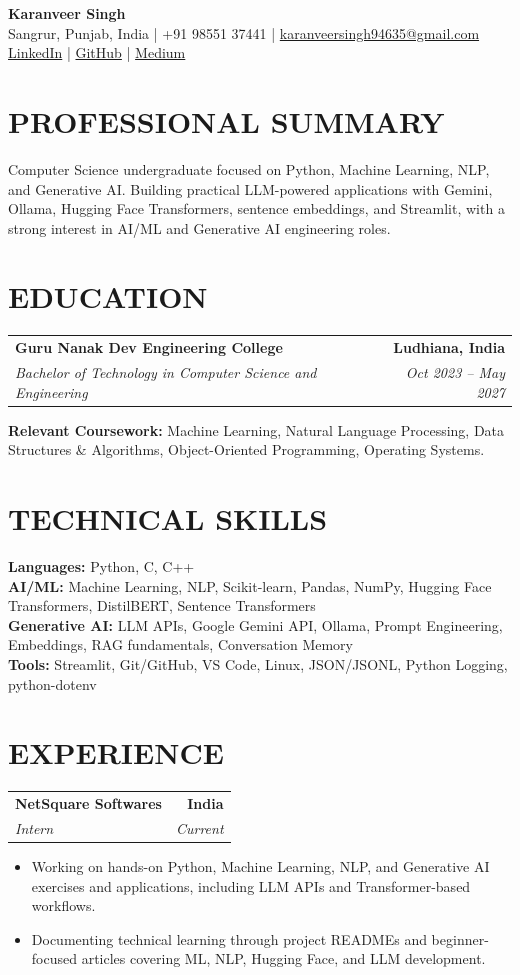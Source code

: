 \documentclass[10pt,a4paper]{article}
\makeatletter
\newcommand{\resumeEntry}[4]{%
  \begin{tabularx}{\linewidth}{@{}Xr@{}}
    \textbf{#1} & \textbf{#2} \\
    \textit{#3} & \textit{#4}
  \end{tabularx}\vspace{-2pt}
}
\makeatother
\begin{document}
\begin{center}
    {\fontsize{22}{24}\selectfont\bfseries Karanveer Singh}\\[3pt]
    Sangrur, Punjab, India \;|\; +91 98551 37441 \;|\;
    \href{mailto:karanveersingh94635@gmail.com}{karanveersingh94635@gmail.com}\\[2pt]
    \href{https://www.linkedin.com/in/karanveer-singh-926a0b287}{LinkedIn} \;|\;
    \href{https://github.com/Karanveer05}{GitHub} \;|\;
    \href{https://medium.com/@karanveernetsquaresoftwares}{Medium}
\end{center}
\vspace{-4pt}

\section{PROFESSIONAL SUMMARY}
Computer Science undergraduate focused on Python, Machine Learning, NLP, and Generative AI. Building practical LLM-powered applications with Gemini, Ollama, Hugging Face Transformers, sentence embeddings, and Streamlit, with a strong interest in AI/ML and Generative AI engineering roles.

\section{EDUCATION}
\resumeEntry{Guru Nanak Dev Engineering College}{Ludhiana, India}{Bachelor of Technology in Computer Science and Engineering}{Oct 2023 -- May 2027}
\textbf{Relevant Coursework:} Machine Learning, Natural Language Processing, Data Structures \& Algorithms, Object-Oriented Programming, Operating Systems.

\section{TECHNICAL SKILLS}
\textbf{Languages:} Python, C, C++ \\
\textbf{AI/ML:} Machine Learning, NLP, Scikit-learn, Pandas, NumPy, Hugging Face Transformers, DistilBERT, Sentence Transformers \\
\textbf{Generative AI:} LLM APIs, Google Gemini API, Ollama, Prompt Engineering, Embeddings, RAG fundamentals, Conversation Memory \\
\textbf{Tools:} Streamlit, Git/GitHub, VS Code, Linux, JSON/JSONL, Python Logging, python-dotenv

\section{EXPERIENCE}
\resumeEntry{NetSquare Softwares}{India}{Intern}{Current}
\begin{itemize}
    \item Working on hands-on Python, Machine Learning, NLP, and Generative AI exercises and applications, including LLM APIs and Transformer-based workflows.
    \item Documenting technical learning through project READMEs and beginner-focused articles covering ML, NLP, Hugging Face, and LLM development.
\end{itemize}
\end{document}

